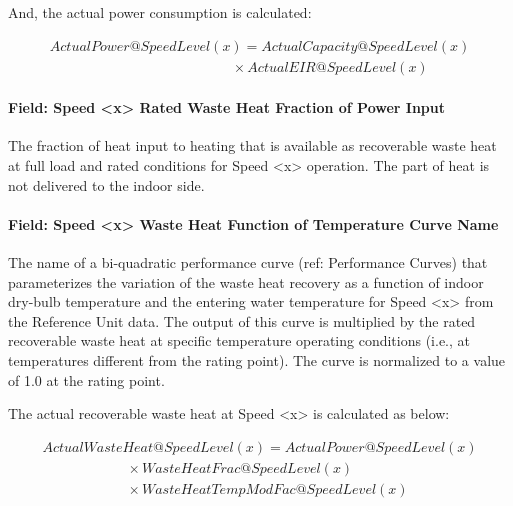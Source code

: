 And, the actual power consumption is calculated:

\begin{equation}
\begin{array}{l}
ActualPower@SpeedLevel\left( x \right) = ActualCapacity@SpeedLevel\left( x \right) \\
\quad \quad \quad \quad \quad \quad \quad \quad \quad \quad \quad \quad \quad \times ActualEIR@SpeedLevel\left( x \right)
\end{array}
\end{equation}

\paragraph{Field: Speed \textless{}x\textgreater{} Rated Waste Heat Fraction of Power Input}\label{field-speed-x-rated-waste-heat-fraction-of-power-input-2}

The fraction of heat input to heating that is available as recoverable waste heat at full load and rated conditions for Speed \textless{}x\textgreater{} operation. The part of heat is not delivered to the indoor side.

\paragraph{Field: Speed \textless{}x\textgreater{} Waste Heat Function of Temperature Curve Name}\label{field-speed-x-waste-heat-function-of-temperature-curve-name-3}

The name of a bi-quadratic performance curve (ref: Performance Curves) that parameterizes the variation of the waste heat recovery as a function of indoor dry-bulb temperature and the entering water temperature for Speed \textless{}x\textgreater{} from the Reference Unit data. The output of this curve is multiplied by the rated recoverable waste heat at specific temperature operating conditions (i.e., at temperatures different from the rating point). The curve is normalized to a value of 1.0 at the rating point.

The actual recoverable waste heat at Speed \textless{}x\textgreater{} is calculated as below:

\begin{equation}
\begin{array}{l}
ActualWasteHeat@SpeedLevel\left( x \right) = ActualPower@SpeedLevel\left( x \right) \\
\quad \quad \quad \quad \quad \quad \times WasteHeatFrac@SpeedLevel(x) \\
\quad \quad \quad \quad \quad \quad \times WasteHeatTempModFac@SpeedLevel(x)
\end{array}
\end{equation}

